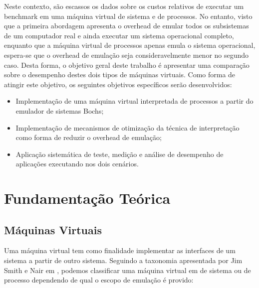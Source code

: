 \documentclass[11pt,twoside]{article}
\begin{document}

Neste contexto, são escassos os dados sobre os custos relativos de executar um benchmark em uma máquina virtual de sistema e de processos. 
No entanto, visto que a primeira abordagem apresenta o overhead de emular todos os subsistemas de um computador real e ainda executar um sistema operacional completo, enquanto que a máquina virtual de processos apenas emula o sistema operacional, espera-se que o overhead de emulação seja consideravelmente menor no segundo caso.
Desta forma, o objetivo geral deste trabalho é apresentar uma comparação sobre o desempenho destes dois tipos de máquinas virtuais.
Como forma de atingir este objetivo, os seguintes objetivos específicos serão desenvolvidos:

\begin{itemize}
 \item Implementação de uma máquina virtual interpretada de processos a partir do emulador de sistemas Bochs;
 \item Implementação de mecanismos de otimização da técnica de interpretação como forma de reduzir o overhead de emulação;
 \item Aplicação sistemática de teste, medição e análise de desempenho de aplicações executando nos dois cenários.
\end{itemize} 







\section{Fundamentação Teórica} \label{sec:fundamentacao}

\subsection{Máquinas Virtuais}

Uma máquina virtual tem como finalidade implementar as interfaces de um sistema a partir de outro sistema.
Seguindo a taxonomia apresentada por Jim Smith e Nair em \cite{Smith2005}, podemos classificar uma máquina
virtual em de sistema ou de processo dependendo de qual o escopo de emulação é provido:
\end{document}
